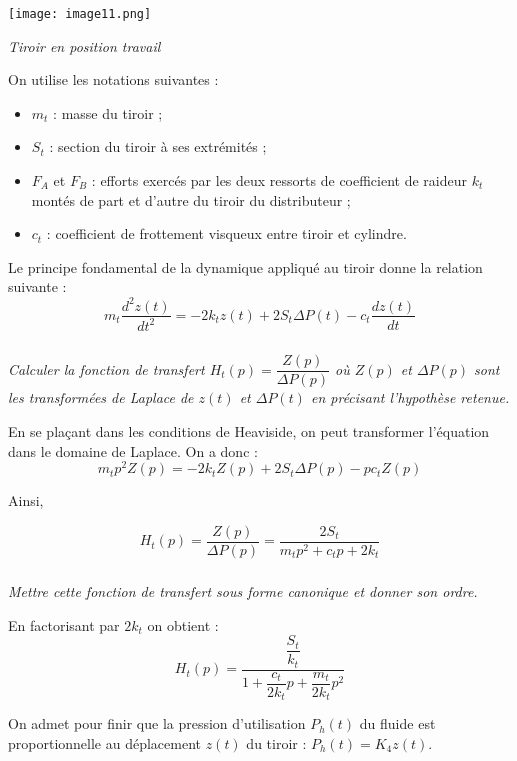 \begin{multicols}{2}
\begin{center}
\texttt{[image: image11.png]}

\textit{Tiroir en position travail}
\end{center}

On utilise les notations suivantes :
\begin{itemize}
\item $m_t$ : masse du tiroir ;
\item $S_t$ : section du tiroir à ses extrémités ;
\item $F_A$ et $F_B$ : efforts exercés par les deux ressorts de coefficient de raideur $k_t$ montés de part et d’autre
du tiroir du distributeur ;
\item $c_t$ : coefficient de frottement visqueux entre tiroir et cylindre.
\end{itemize}

Le principe fondamental de la dynamique appliqué au tiroir donne la relation suivante :
$$
m_t\dfrac{d^2z(t)}{dt^2} = -2k_tz(t) + 2S_t\Delta P(t) -c_t \dfrac{dz(t)}{dt}
$$

\fi


\subparagraph{}
\textit{Calculer la fonction de transfert $H_t(p)=\dfrac{Z(p)}{\Delta P(p)}$ 
où $Z(p)$ et $\Delta P(p)$ sont les transformées de Laplace de $z(t)$ et 
$\Delta P(t)$ en précisant l'hypothèse retenue.}
\ifprof
\begin{corrige}

En se plaçant dans les conditions de Heaviside, on peut transformer l'équation
dans le domaine de Laplace. On a donc : 
$$
m_t p^2 Z(p) = -2k_t Z(p) + 2 S_t \Delta P(p) - pc_t Z(p)
$$

Ainsi, 

$$
H_t(p)=\dfrac{Z(p)}{\Delta P(p)} = \dfrac{2S_t}{m_tp^2+c_tp+2k_t}
$$
\end{corrige}
\else
\fi

\subparagraph{}
\textit{Mettre cette fonction de transfert sous forme canonique et donner son ordre.}

\ifprof
\begin{corrige}

En factorisant par $2k_t$ on obtient : 
$$
H_t(p)= \dfrac{\dfrac{S_t}{k_t}}{1+\dfrac{c_t}{2k_t}p+\dfrac{m_t}{2k_t}p^2}
$$

\end{corrige}
\else
\fi
On admet pour finir que la pression d'utilisation $P_h(t)$ du fluide est proportionnelle au déplacement $z(t)$ du tiroir : $P_h(t) =K_4 z(t)$.


\end{multicols}
